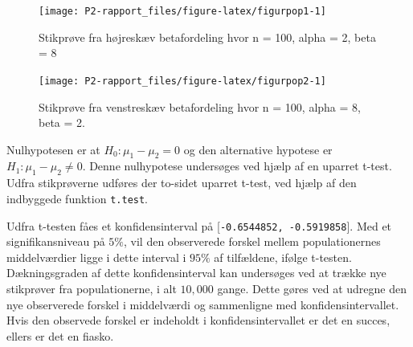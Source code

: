 \documentclass[
]{book}
\newenvironment{Shaded}{\begin{snugshade}}{\end{snugshade}}
\newcommand{\CommentTok}[1]{\textcolor[rgb]{0.56,0.35,0.01}{\textit{#1}}}
\newcommand{\DataTypeTok}[1]{\textcolor[rgb]{0.13,0.29,0.53}{#1}}
\newcommand{\DecValTok}[1]{\textcolor[rgb]{0.00,0.00,0.81}{#1}}
\newcommand{\FloatTok}[1]{\textcolor[rgb]{0.00,0.00,0.81}{#1}}
\newcommand{\KeywordTok}[1]{\textcolor[rgb]{0.13,0.29,0.53}{\textbf{#1}}}
\newcommand{\NormalTok}[1]{#1}
\newcommand{\OperatorTok}[1]{\textcolor[rgb]{0.81,0.36,0.00}{\textbf{#1}}}
\newcommand{\StringTok}[1]{\textcolor[rgb]{0.31,0.60,0.02}{#1}}
\theoremstyle{definition}
\theoremstyle{definition}
\theoremstyle{definition}
\theoremstyle{remark}
\begin{document}
\begin{figure}

{\centering \texttt{[image: P2-rapport\_files/figure-latex/figurpop1-1]}

}

\caption{Stikprøve fra højreskæv betafordeling hvor n = 100, alpha = 2, beta = 8}\label{fig:figurpop1}
\end{figure}

\begin{figure}

{\centering \texttt{[image: P2-rapport\_files/figure-latex/figurpop2-1]}

}

\caption{Stikprøve fra venstreskæv betafordeling hvor n = 100, alpha = 8, beta = 2.}\label{fig:figurpop2}
\end{figure}

Nulhypotesen er at \(H_0: \mu_1 - \mu_2 = 0\) og den alternative hypotese er \(H_1 : \mu_1 - \mu_2 \neq 0\). Denne nulhypotese undersøges ved hjælp af en uparret t-test. Udfra stikprøverne udføres der to-sidet uparret t-test, ved hjælp af den indbyggede funktion \texttt{t.test}.

\begin{Shaded}
\end{Shaded}

Udfra t-testen fåes et konfidensinterval på {[}\texttt{-0.6544852,\ -0.5919858}{]}. Med et signifikansniveau på \(5\%\), vil den observerede forskel mellem populationernes middelværdier ligge i dette interval i \(95\%\) af tilfældene, ifølge t-testen. Dækningsgraden af dette konfidensinterval kan undersøges ved at trække nye stikprøver fra populationerne, i alt \(10,000\) gange. Dette gøres ved at udregne den nye observerede forskel i middelværdi og sammenligne med konfidensintervallet. Hvis den observede forskel er indeholdt i konfidensintervallet er det en succes, ellers er det en fiasko.
\end{document}
